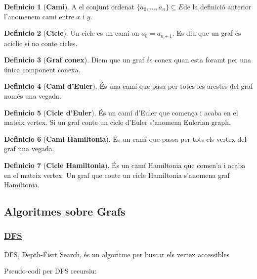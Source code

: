 \documentclass[12pt]{article}
\theoremstyle{definition}
\newtheorem{definicio}{Definicio}
\theoremstyle{definition}
\theoremstyle{definition}
\theoremstyle{definition}
\theoremstyle{definition}
\theoremstyle{definition}
\theoremstyle{definition}
\begin{document}
\begin{definicio}[\textbf{Cami}]
A el conjunt ordenat $\{a_0,\dots,a_n\}\subseteq E$de la definició anterior l'anomenem cami entre $x$ i $y$.
\end{definicio}

\begin{definicio}[\textbf{Cicle}]
Un cicle es un cami on $a_0=a_{n+1}$. Es diu que un graf és acíclic si no conte cicles.
\end{definicio}

\begin{definicio}[\textbf{Graf conex}]
Diem que un graf és conex quan esta foramt per una única component conexa.
\end{definicio}

\begin{definicio}[\textbf{Cami d'Euler}]
És una camí que pasa per totes les arestes del graf només una vegada.
\end{definicio}

\begin{definicio}[\textbf{Cicle d'Euler}]
És un camí d'Euler que comença i acaba en el mateix vertex. Si un graf conte un cicle d'Euler s'anomena Eulerian graph.
\end{definicio}

\begin{definicio}[\textbf{Cami Hamiltonia}]
És un camí que passa per tots els vertex del graf una vegada.
\end{definicio}

\begin{definicio}[\textbf{Cicle Hamiltonia}]
És un camí Hamiltonia que comen'a i acaba en el mateix vertex. Un graf que conte un cicle Hamiltonia s'anomena graf Hamiltonia.
\end{definicio}

\subsection{Algoritmes sobre Grafs}

\subsubsection{\href{https://en.wikipedia.org/wiki/Depth-first_search}{\color{blue}\underline{DFS}}}
DFS, Depth-Fisrt Search, és un algoritme per buscar els vertex accessibles

Pseudo-codi per DFS recursiu:

\end{document}
